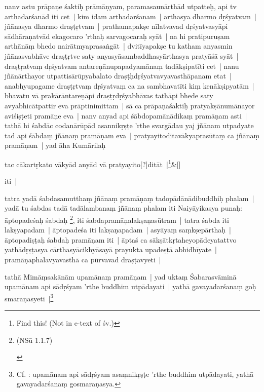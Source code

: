 \documentclass[article,12pt,a4paper]{memoir}
\newcommand{\gap}[1]{}
\newcommand{\unclear}[1]{($^{?}$#1)}
\newcommand{\add}[1]{($^{+}$#1)}
\newcommand{\deletion}[1]{($^{-}$#1)}
\newcommand{\name}[1]{#1}
\newcommand{\persName}[1]{#1}
\begin{document}
	  \pstart nanv astu prāpaṇe śaktiḥ prāmāṇyam, paramasaunārthād utpatteḥ, api tv arthadarśanād iti cet | kim idam arthadarśanam | arthasya dharmo dṛśyatvam | jñānasya dharmo draṣṭṛtvam | prathamapakṣe nīlatvavad dṛśyatvasyāpi sādhāraṇatvād ekagocaro 'rthaḥ sarvagocaraḥ syāt | na hi pratipuruṣam arthānāṃ bhedo nairātmyaprasaṅgāt | dvitīyapakṣe tu katham anyasmin jñānasvabhāve draṣṭṛtve saty anyasyāsambaddhasyārthasya pratyāśā syāt | draṣṭṛatvaṃ dṛśyatvam antareṇānupapadyamānaṃ tadākṣipatīti cet | nanu jñānārthayor utpattisārūpyabalato draṣṭḥdṛśyatvavyavasthāpanam etat | anabhyupagame draṣṭṛtvaṃ dṛśyatvaṃ ca na sambhavatīti kiṃ kenākṣipyatām | bhavatu vā prakārāntareṇāpi draṣṭṛdṛśyabhāvas tathāpi bhede saty avyabhicā\edtext{ra du}{\Afootnote{ra\deletion{\unclear{ḥ}\gap{}\add{\unclear{}}}du \cite{RNAms} ; ras ta \cite{thakur75}   {\rmlatinfont [App type: var]}}}tpattir eva prāptinimittam | sā ca prāpaṇaśaktiḥ pratyakṣānumānayor aviśiṣṭeti pramāṇe eva | \label{thakur75-97.23} nanv anyad api śābdopamānādikaṃ pramāṇam asti | tathā hi śabdāc codanārūpād asannikṛṣṭe 'rthe svargādau yaj jñānam utpadyate tad api śābdaṃ jñānaṃ pramāṇam eva | pratyayitoditavākyaprasūtaṃ ca jñānaṃ pramāṇam | yad āha Kumārilaḥ
	\pend
      
	    
	    \stanza[\smallbreak]
	tac cākartṛkato vākyād anyād vā pratyayito[?]ditāt |\footnote{Find this! (Not in e-text of śv.)}\&[\smallbreak]


	

	  \pstart iti |
	\pend
      

	  \pstart tatra yadā śabdasamutthaṃ jñānaṃ pramāṇaṃ tadopādānādibuddhiḥ phalam | yadā tu śabdas tadā tadālambanaṃ jñānaṃ phalam iti Naiyāyikasya punaḥ: āptopadeśaḥ śabdaḥ \footnote{\begin{english}(NSū 1.1.7)\end{english}}, iti śabdapramāṇalakṣaṇasūtram | tatra śabda iti lakṣyapadam | āptopadeśa iti lakṣaṇapadam | asyāyaṃ saṃkṣepārthaḥ | āptopadiṣṭaḥ śabdaḥ pramāṇam iti | āptaś ca sākṣātkṛtaheyopādeyatattvo yathādṛṣṭasya cārthasyācikhyāsayā prayukta upadeṣṭā abhidhīyate | pramāṇaphalavyavasthā ca pūrvavad draṣṭavyeti |
	\pend
      

	  \pstart tathā \name{Mīmāṃsakānām} upamānaṃ pramāṇam | yad uktaṃ \persName{Śabarasvāminā} \label{kāśikā1_start}upamānam api sādṛśyam  'rthe buddhim utpādayati | yathā gavayadarśanaṃ goḥ smaraṇasyeti |\footnote{Cf. \cite{śabara_bhāṣya}: upamānam api sādṛśyam asaṃnikṛṣṭe 'rthe buddhim utpādayati, yathā gavayadarśanaṃ gosmaraṇasya.}
	\pend
      
\end{document}
